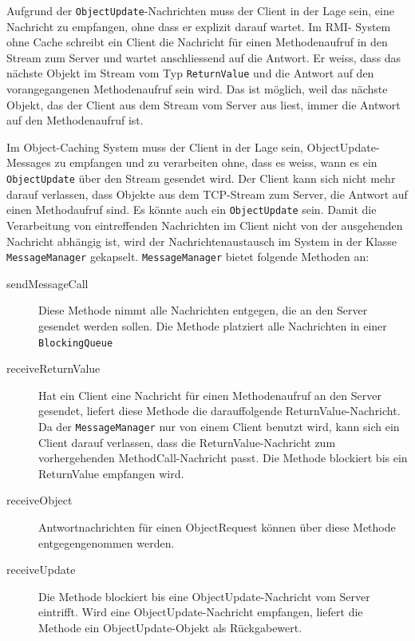 Aufgrund der \verb|ObjectUpdate|-Nachrichten muss der Client in der Lage sein, eine Nachricht zu empfangen, ohne dass er explizit darauf wartet. Im RMI- System ohne Cache schreibt ein Client die Nachricht für einen Methodenaufruf in den Stream zum Server und wartet anschliessend auf die Antwort. Er weiss, dass das nächste Objekt im Stream vom Typ \texttt{ReturnValue} und die Antwort auf den vorangegangenen Methodenaufruf sein wird. Das ist möglich, weil das nächste Objekt, das der Client aus dem Stream vom Server aus liest, immer die Antwort auf den Methodenaufruf ist.

Im Object-Caching System muss der Client in der Lage sein, Object\-Update\--Messages zu empfangen und zu verarbeiten ohne, dass es weiss, wann es ein \verb|ObjectUpdate| über den Stream gesendet wird. Der Client kann sich nicht mehr darauf verlassen, dass Objekte aus dem TCP-Stream zum Server, die Antwort auf einen Methodaufruf sind. Es könnte auch ein \texttt{ObjectUpdate} sein. Damit die Verarbeitung von eintreffenden Nach\-richten im Client nicht von der ausgehenden Nachricht abhängig ist, wird der Nach\-richt\-enaustausch im System in der Klasse \verb|MessageManager| gekapselt. \texttt{MessageManager} bietet folgende Methoden an:

\begin{description}
\item[sendMessageCall] Diese Methode nimmt alle Nachrichten entgegen, die an den Server gesendet werden sollen. Die Methode platziert alle Nachrichten in einer \verb|BlockingQueue| 
\item[receiveReturnValue] Hat ein Client eine Nachricht für einen Methodenaufruf an den Server gesendet, liefert diese Methode die darauffolgende ReturnValue-Nachricht. Da der \verb+MessageManager+ nur von einem Client benutzt wird, kann sich ein Client darauf verlassen, dass die ReturnValue-Nachricht zum vorhergehenden MethodCall-Nach\-richt passt. Die Methode blockiert bis ein ReturnValue empfangen wird.
\item[receiveObject] Antwortnachrichten für einen ObjectRequest können über diese Methode entgegengenommen werden. 
\item[receiveUpdate] Die Methode blockiert bis eine ObjectUpdate-Nachricht vom Server eintrifft. Wird eine ObjectUpdate-Nachricht empfangen, liefert die Methode ein ObjectUpdate-Objekt als Rückgabewert.
\end{description}

